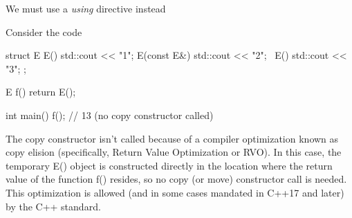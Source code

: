 \documentclass{report}
\begin{document}
\pagebreak 
{}
\bigbreak \noindent 
We must use a \textit{using} directive instead


\pagebreak 
{}
\bigbreak \noindent 
Consider the code
\bigbreak \noindent 
\begin{cppcode}
    struct E
    {
        E() { std::cout << "1"; }
        E(const E&) { std::cout << "2"; }
        ~E() { std::cout << "3"; }
    };

    E f()
    {
        return E();
    }

    int main()
    {
        f(); // 13 (no copy constructor called)
    }
\end{cppcode}
\bigbreak \noindent 
The copy constructor isn't called because of a compiler optimization known as copy elision (specifically, Return Value Optimization or RVO). In this case, the temporary E() object is constructed directly in the location where the return value of the function f() resides, so no copy (or move) constructor call is needed. This optimization is allowed (and in some cases mandated in C++17 and later) by the C++ standard.
\bigbreak \noindent 
\end{document}

